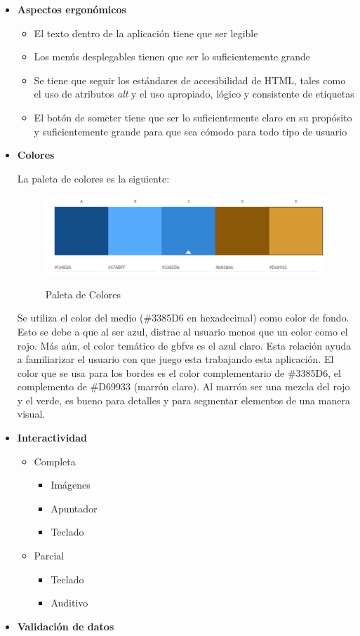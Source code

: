 \begin{itemize}
    \item \textbf{Aspectos ergonómicos}
    \begin{itemize}
        \item El texto dentro de la aplicación tiene que ser legible
        \item Los menús desplegables tienen que ser lo suficientemente grande
        \item Se tiene que seguir los estándares de accesibilidad de HTML, tales como el uso de atributos \textit{alt} y el uso apropiado, lógico y consistente de etiquetas
        \item El botón de someter tiene que ser lo suficientemente claro en su propósito y suficientemente grande para que sea cómodo para todo tipo de usuario
    \end{itemize}
    \item \textbf{Colores}
    
    La paleta de colores es la siguiente:
    \begin{figure}[ht!]
        \centering
        \caption{Paleta de Colores}
        \includegraphics[width=1.0\textwidth]{figures/pallete_updated.png}
        \label{fig: pallete}
    \end{figure}

    Se utiliza el color del medio (\#3385D6 en hexadecimal) como color de fondo. Esto se debe a que al ser azul, distrae al usuario menos que un color como el rojo. Más aún, el color temático de \gls{gbfvs} es el azul claro. Esta relación ayuda a familiarizar el usuario con que juego esta trabajando esta aplicación. El color que se usa para los bordes es el color complementario de \#3385D6, el complemento de \#D69933 (marrón claro). Al marrón ser una mezcla del rojo y el verde, es bueno para detalles y para segmentar elementos de una manera visual.
    \item \textbf{Interactividad}
    \begin{itemize}
        \item Completa
        \begin{itemize}
            \item Imágenes
            \item Apuntador
            \item Teclado
        \end{itemize}
        \item Parcial
        \begin{itemize}
            \item Teclado
            \item Auditivo
        \end{itemize}
    \end{itemize}
    \item \textbf{Validación de datos}
    

\end{itemize}
